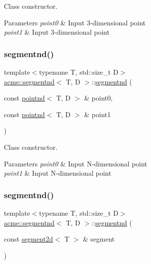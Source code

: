 Class constructor. 


\begin{DoxyParams}{Parameters}
{\em point0} & Input 3-\/dimensional point \\
\hline
{\em point1} & Input 3-\/dimensional point \\
\hline
\end{DoxyParams}
\mbox{\label{classacme_1_1segmentnd_a0f6c38e8fe244f629a0f34a3451f8ead}} 
\subsubsection{\texorpdfstring{segmentnd()}{segmentnd()}\hspace{0.1cm}{\footnotesize\ttfamily [3/4]}}
{\footnotesize\ttfamily template$<$typename T, std\+::size\+\_\+t D$>$ \\
\hyperlink{classacme_1_1segmentnd}{acme\+::segmentnd}$<$ T, D $>$\+::\hyperlink{classacme_1_1segmentnd}{segmentnd} (\begin{DoxyParamCaption}\item[{const \hyperlink{classacme_1_1pointnd}{pointnd}$<$ T, D $>$ \&}]{point0,  }\item[{const \hyperlink{classacme_1_1pointnd}{pointnd}$<$ T, D $>$ \&}]{point1 }\end{DoxyParamCaption})\hspace{0.3cm}{\ttfamily [inline]}}



Class constructor. 


\begin{DoxyParams}{Parameters}
{\em point0} & Input N-\/dimensional point \\
\hline
{\em point1} & Input N-\/dimensional point \\
\hline
\end{DoxyParams}
\mbox{\label{classacme_1_1segmentnd_a4afa0be2c691e1c8a7239f547879538f}} 
\subsubsection{\texorpdfstring{segmentnd()}{segmentnd()}\hspace{0.1cm}{\footnotesize\ttfamily [4/4]}}
{\footnotesize\ttfamily template$<$typename T, std\+::size\+\_\+t D$>$ \\
\hyperlink{classacme_1_1segmentnd}{acme\+::segmentnd}$<$ T, D $>$\+::\hyperlink{classacme_1_1segmentnd}{segmentnd} (\begin{DoxyParamCaption}\item[{const \hyperlink{classacme_1_1segment2d}{segment2d}$<$ T $>$ \&}]{segment }\end{DoxyParamCaption})\hspace{0.3cm}{\ttfamily [inline]}}



